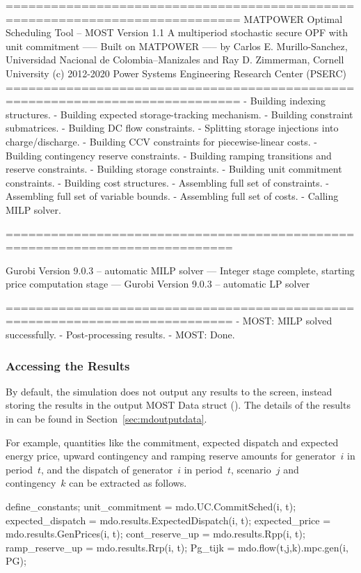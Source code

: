 \documentclass[12pt]{article}
\newcommand{\most}[0]{{MOST}}
\newcommand{\md}[0]{{\most{} Data struct}}
\newcommand{\code}[1]{{\relsize{-0.5}{\tt{{#1}}}}}  %
\numberwithin{equation}{section}
\numberwithin{table}{section}
\numberwithin{figure}{section}
\begin{document}
\begin{Code}
=============================================================================
          MATPOWER Optimal Scheduling Tool  --  MOST Version 1.1
          A multiperiod stochastic secure OPF with unit commitment
                       -----  Built on MATPOWER  -----
  by Carlos E. Murillo-Sanchez, Universidad Nacional de Colombia--Manizales
                  and Ray D. Zimmerman, Cornell University
       (c) 2012-2020 Power Systems Engineering Research Center (PSERC)       
=============================================================================
- Building indexing structures.
- Building expected storage-tracking mechanism.
- Building constraint submatrices.
  - Building DC flow constraints.
  - Splitting storage injections into charge/discharge.
  - Building CCV constraints for piecewise-linear costs.
  - Building contingency reserve constraints.
  - Building ramping transitions and reserve constraints.
  - Building storage constraints.
  - Building unit commitment constraints.
- Building cost structures.
- Assembling full set of constraints.
- Assembling full set of variable bounds.
- Assembling full set of costs.
- Calling MILP solver.

============================================================================

Gurobi Version 9.0.3 -- automatic MILP solver
--- Integer stage complete, starting price computation stage ---
Gurobi Version 9.0.3 -- automatic LP solver

============================================================================
- MOST: MILP solved successfully.
- Post-processing results.
- MOST: Done.
\end{Code}

\subsubsection{Accessing the Results}

By default, the simulation does not output any results to the screen, instead storing the results in the output \md{} (\code{mdo}).
The details of the results in \code{mdo} can be found in Section~\ref{sec:mdoutputdata}.

For example, quantities like the commitment, expected dispatch and expected energy price, upward contingency and ramping reserve amounts for generator~$i$ in period~$t$, and the dispatch of generator~$i$ in period~$t$, scenario~$j$ and contingency~$k$ can be extracted as follows.
\begin{Code}
define_constants;
unit_commitment     = mdo.UC.CommitSched(i, t);
expected_dispatch   = mdo.results.ExpectedDispatch(i, t);
expected_price      = mdo.results.GenPrices(i, t);
cont_reserve_up     = mdo.results.Rpp(i, t);
ramp_reserve_up     = mdo.results.Rrp(i, t);
Pg_tijk             = mdo.flow(t,j,k).mpc.gen(i, PG);
\end{Code}
\end{document}

